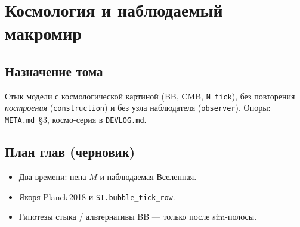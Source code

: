\part{Космология и наблюдаемый макромир}

\chapter{Назначение тома}
Стык модели с космологической картиной (BB, CMB, \texttt{N\_tick}),
без повторения \emph{построения} (\texttt{construction}) и без узла наблюдателя (\texttt{observer}).
Опоры: \texttt{META.md}~\S3, космо-серия в \texttt{DEVLOG.md}.

\chapter{План глав (черновик)}
\begin{itemize}
  \item Два времени: пена $M$ и наблюдаемая Вселенная.
  \item Якоря Planck\,2018 и \texttt{SI.bubble\_tick\_row}.
  \item Гипотезы стыка / альтернативы BB --- только после sim-полосы.
\end{itemize}




